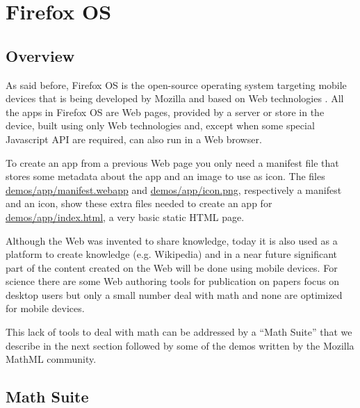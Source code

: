 \section{Firefox OS}
\label{sec:firefoxOS}

\subsection{Overview}

As said before,
Firefox OS is the open-source operating system targeting mobile devices that
is being
developed by Mozilla and based on Web technologies \cite{MozillaFirefoxOS}.
All the apps in Firefox OS
are Web pages, provided by a server or store in the device, built using only Web
technologies and, except when
some special Javascript API are required, can also run in a Web browser.

To create an app from a previous Web page you only need a manifest
file that stores some metadata about the app and an image to use as icon. The
files
\href{http://fred-wang.github.io/MathUI2014/demos/app/manifest.webapp}{demos/app/manifest.webapp}
and
\href{http://fred-wang.github.io/MathUI2014/demos/app/icon.png}{demos/app/icon.png},
respectively a manifest and an icon,
show these extra files needed to create an app for
\href{http://fred-wang.github.io/MathUI2014/demos/app/index.html}{demos/app/index.html},
a very basic static HTML page.

Although the Web was invented to share knowledge, today it is also used
as a platform to create knowledge (e.g. Wikipedia) and in a near future
significant part of the content created on the Web will be done using mobile
devices. For science there are some Web authoring tools for publication on
papers focus on desktop users but only a small number deal with math and none
are optimized for mobile devices.

This lack of tools to deal with math can be addressed by a ``Math Suite'' that
we describe in the next section followed by some of the demos written by the
Mozilla MathML community.

\subsection{Math Suite}


